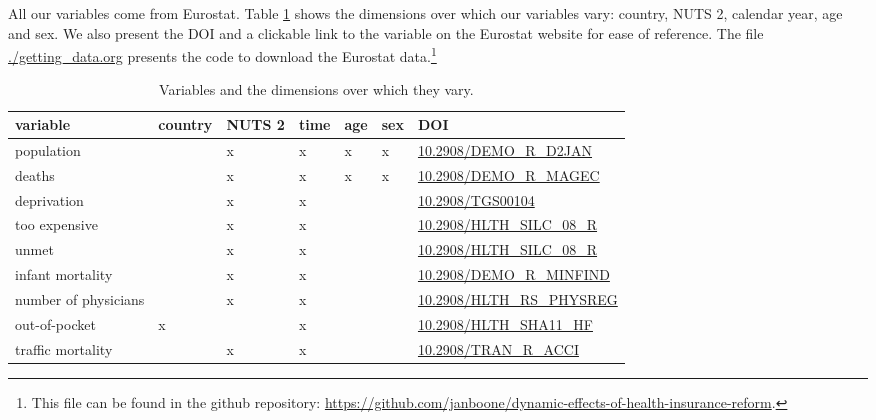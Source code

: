 \documentclass[a4paper,12pt]{article}
\begin{document}
All our variables come from Eurostat. Table \ref{tab:VariablesDimensions} shows the dimensions over which our variables vary: country, NUTS 2, calendar year, age and sex. We also present the DOI and a clickable link to the variable on the Eurostat website for ease of reference. The file \url{./getting\_data.org} presents the code to download the Eurostat data.\footnote{This file can be found in the github repository: \href{https://github.com/janboone/dynamic-effects-of-health-insurance-reform}{https://github.com/janboone/dynamic-effects-of-health-insurance-reform}.}


\begin{table}[htbp]
\caption{\label{tab:VariablesDimensions}Variables and the dimensions over which they vary.}
\centering
\begin{tabular}{lllllll}
variable & country & NUTS 2 & time & age & sex & DOI\\
\hline
population &  & x & x & x & x & \href{https://ec.europa.eu/eurostat/databrowser/view/DEMO\_R\_D2JAN/default/table?lang=en\&category=demo.demopreg}{10.2908/DEMO\_R\_D2JAN}\\
deaths &  & x & x & x & x & \href{https://ec.europa.eu/eurostat/databrowser/view/DEMO\_R\_MAGEC/default/table?lang=en\&category=demo.demomreg}{10.2908/DEMO\_R\_MAGEC}\\
deprivation &  & x & x &  &  & \href{https://ec.europa.eu/eurostat/databrowser/view/tgs00104/default/table?lang=en}{10.2908/TGS00104}\\
too expensive &  & x & x &  &  & \href{https://ec.europa.eu/eurostat/databrowser/view/hlth\_silc\_08\_r/default/table?lang=en}{10.2908/HLTH\_SILC\_08\_R}\\
unmet &  & x & x &  &  & \href{https://ec.europa.eu/eurostat/databrowser/view/hlth\_silc\_08\_r/default/table?lang=en}{10.2908/HLTH\_SILC\_08\_R}\\
infant mortality &  & x & x &  &  & \href{https://ec.europa.eu/eurostat/databrowser/view/DEMO\_R\_MINFIND/default/table?lang=en\&category=demo.demomreg}{10.2908/DEMO\_R\_MINFIND}\\
number of physicians &  & x & x &  &  & \href{https://ec.europa.eu/eurostat/databrowser/view/hlth\_rs\_physreg/default/table?lang=en\&category=hlth.hlth\_care.hlth\_res.hlth\_staff}{10.2908/HLTH\_RS\_PHYSREG}\\
out-of-pocket & x &  & x &  &  & \href{https://ec.europa.eu/eurostat/databrowser/view/hlth\_sha11\_hf/default/table?lang=en}{10.2908/HLTH\_SHA11\_HF}\\
traffic mortality &  & x & x &  &  & \href{https://ec.europa.eu/eurostat/databrowser/view/tran\_r\_acci/default/table?lang=en}{10.2908/TRAN\_R\_ACCI}\\

\end{tabular}
\end{table}
\end{document}
